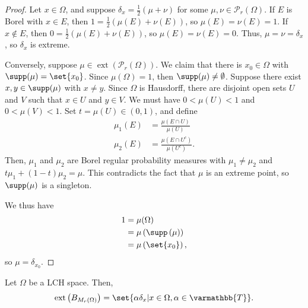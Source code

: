 \documentclass[10pt]{mypackage}
\renewcommand*{\mathbb}[1]{\varmathbb{#1}}
\begin{document}
\begin{proof}
  Let $x\in\Omega$, and suppose $\delta_{x} = \frac{1}{2}\left(\mu + \nu\right)$ for some $\mu,\nu\in \mathcal{P}_{r}(\Omega)$. If $E$ is Borel with $x\in E$, then $1 = \frac{1}{2}\left(\mu(E) + \nu(E)\right)$, so $\mu(E) = \nu(E) = 1$. If $x\notin E$, then $0 = \frac{1}{2}\left(\mu(E) + \nu(E)\right)$, so $\mu(E) = \nu(E) = 0$. Thus, $\mu = \nu = \delta_x$, so $\delta_x$ is extreme.\newline

  Conversely, suppose $\mu\in \operatorname{ext}\left(\mathcal{P}_{r}(\Omega)\right)$. We claim that there is $x_0\in \Omega$ with $\supp(\mu) = \set{x_0}$. Since $\mu(\Omega) = 1$, then $\supp(\mu)\neq \emptyset$. Suppose there exist $x,y\in \supp(\mu)$ with $x\neq y$. Since $\Omega$ is Hausdorff, there are disjoint open sets $U$ and $V$ such that $x\in U$ and $y\in V$. We must have $0 < \mu(U) < 1$ and $0 < \mu(V) < 1$. Set $t = \mu(U)\in (0,1)$, and define
  \begin{align*}
    \mu_1(E) &= \frac{\mu(E\cap U)}{\mu(U)}\\
    \mu_{2}(E) &= \frac{\mu\left(E\cap U^{c}\right)}{\mu\left(U^{c}\right)}.
  \end{align*}
  Then, $\mu_1$ and $\mu_2$ are Borel regular probability measures with $\mu_1\neq \mu_2$ and $t\mu_1 + (1-t)\mu_2 = \mu$. This contradicts the fact that $\mu$ is an extreme point, so $\supp(\mu)$ is a singleton.\newline

  We thus have
  \begin{align*}
    1 &= \mu(\Omega)\\
      &= \mu\left(\supp\left(\mu\right)\right)\\
      &= \mu\left(\set{x_0}\right),
  \end{align*}
  so $\mu = \delta_{x_0}$.
\end{proof}
\begin{theorem}
  Let $\Omega$ be a LCH space. Then,
  \begin{align*}
    \operatorname{ext}\left(B_{M_{r}\left(\Omega\right)}\right) = \set{\alpha \delta_{x} | x\in\Omega,\alpha\in \mathbb{T}}.
  \end{align*}
\end{theorem}
\end{document}
